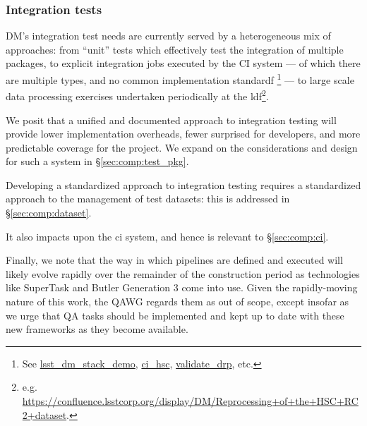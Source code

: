 \subsubsection{Integration tests}

DM's integration test needs are currently served by a heterogeneous mix of
approaches: from ``unit'' tests which effectively test the integration of
multiple packages, to explicit integration jobs executed by the CI
system --- of which there are multiple types, and no common
implementation standardf \footnote{See
\href{https://github.com/lsst/lsst_dm_stack_demo}{lsst\_dm\_stack\_demo},
\href{https://github.com/lsst/ci_hsc}{ci\_hsc},
\href{https://github.com/lsst/validate_drp}{validate\_drp}, etc.} --- to large
scale data processing exercises undertaken periodically at the
\gls{ldf}\footnote{e.g.
\url{https://confluence.lsstcorp.org/display/DM/Reprocessing+of+the+HSC+RC2+dataset}.}.

We posit that a unified and documented approach to integration testing will
provide lower implementation overheads, fewer surprised for developers, and
more predictable coverage for the project. We expand on the considerations and
design for such a system in \S\ref{sec:comp:test_pkg}.

Developing a standardized approach to integration testing requires a
standardized approach to the management of test datasets: this is addressed in
\S\ref{sec:comp:dataset}.

It also impacts upon the \gls{ci} system, and hence is relevant to
\S\ref{sec:comp:ci}.

Finally, we note that the way in which pipelines are defined and executed will
likely evolve rapidly over the remainder of the construction period as
technologies like SuperTask and Butler Generation 3 come into use. Given the
rapidly-moving nature of this work, the QAWG regards them as out of scope,
except insofar as we urge that QA tasks should be implemented and kept up to
date with these new frameworks as they become available.
